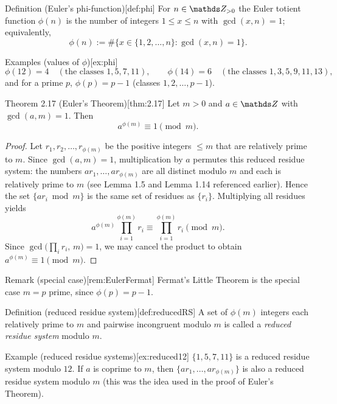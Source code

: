 \documentclass[10pt]{article}
\theoremstyle{definition}
\theoremstyle{plain}
\numberwithin{equation}{section}
\begin{document}
\begin{define}{Definition (Euler's phi-function)}[def:phi]
For $n\in\setZ_{>0}$ the Euler totient function $\phi(n)$ is the number of integers
$1\le x\le n$ with $\gcd(x,n)=1$; equivalently,
\[
\phi(n):=\#\{x\in\{1,2,\dots,n\}:\gcd(x,n)=1\}.
\]
\end{define}

\begin{define}{Examples (values of $\phi$)}[ex:phi]
\[
\phi(12)=4\quad(\text{the classes }1,5,7,11),\qquad
\phi(14)=6\quad(\text{the classes }1,3,5,9,11,13),
\]
and for a prime $p$, $\phi(p)=p-1$ (classes $1,2,\dots,p-1$).
\end{define}

\begin{define}{Theorem 2.17 (Euler's Theorem)}[thm:2.17]
Let $m>0$ and $a\in\setZ$ with $\gcd(a,m)=1$. Then
\[
a^{\phi(m)}\equiv 1\pmod m.
\]
\end{define}

\begin{proof}
Let $r_1,r_2,\dots,r_{\phi(m)}$ be the positive integers $\le m$ that are relatively prime to $m$.
Since $\gcd(a,m)=1$, multiplication by $a$ permutes this reduced residue system: the numbers
$a r_1,\dots,a r_{\phi(m)}$ are all distinct modulo $m$ and each is relatively prime to $m$
(see Lemma 1.5 and Lemma 1.14 referenced earlier). Hence the set $\{a r_i\bmod m\}$ is the same
set of residues as $\{r_i\}$. Multiplying all residues yields
\[
a^{\phi(m)} \prod_{i=1}^{\phi(m)} r_i \equiv \prod_{i=1}^{\phi(m)} r_i \pmod m.
\]
Since $\gcd\big(\prod_i r_i,\, m\big)=1$, we may cancel the product to obtain
$a^{\phi(m)}\equiv 1\pmod m$.
\end{proof}

\begin{define}{Remark (special case)}[rem:EulerFermat]
Fermat's Little Theorem is the special case $m=p$ prime, since $\phi(p)=p-1$.
\end{define}

\begin{define}{Definition (reduced residue system)}[def:reducedRS]
A set of $\phi(m)$ integers each relatively prime to $m$ and pairwise incongruent modulo $m$
is called a \emph{reduced residue system} modulo $m$.
\end{define}

\begin{define}{Example (reduced residue systems)}[ex:reduced12]
$\{1,5,7,11\}$ is a reduced residue system modulo $12$. If $a$ is coprime to $m$, then
$\{ar_1,\dots,ar_{\phi(m)}\}$ is also a reduced residue system modulo $m$ (this was the idea
used in the proof of Euler's Theorem).
\end{define}
\end{document}

